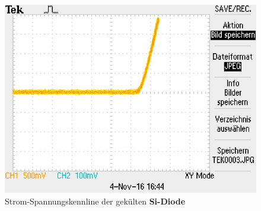 \begin{figure}[!h]
\begin{center}
\includegraphics[scale=1]{bilder/Versuch2/kuhlsiDiode}
\caption{Strom-Spannungskennline der gek\"ulten \textbf{Si-Diode}}
\end{center}
\end{figure}